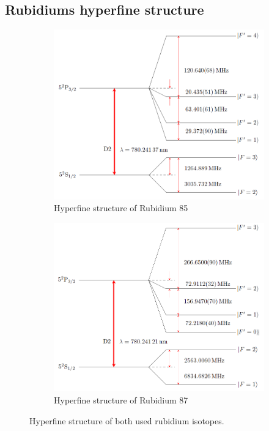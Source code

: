 \documentclass[]{article}
\begin{document}
\subsection{Rubidiums hyperfine structure}
\begin{figure}[H]
\centering
\begin{subfigure}{.8\textwidth}
\centering
\includegraphics[width=1\textwidth]{Plots/Level85.png}
\caption{Hyperfine structure of Rubidium 85 \cite{steck85} }
\end{subfigure}

\begin{subfigure}{.8\textwidth}
\centering
\includegraphics[width=1\textwidth]{Plots/Level87.png}
\caption{Hyperfine structure of Rubidium 87 \cite{steck87}}
\end{subfigure}

\caption{Hyperfine structure of both used rubidium isotopes.}
\label{fig:Rb_hyperfine}
\end{figure}
\end{document}
